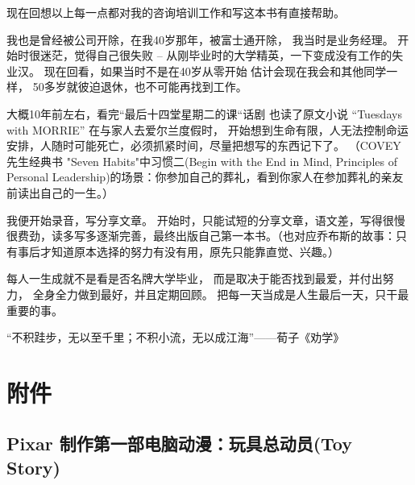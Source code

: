 {\begin{minipage}[t]{0.97\columnwidth}
现在回想以上每一点都对我的咨询培训工作和写这本书有直接帮助。

\begin{description}
\item[]
\begin{description}
\tightlist
\item[]
= = =
\end{description}
\end{description}

我也是曾经被公司开除，在我40岁那年，被富士通开除， 我当时是业务经理。
开始时很迷茫，觉得自己很失败 --
从刚毕业时的大学精英，一下变成没有工作的失业汉。
现在回看，如果当时不是在40岁从零开始 估计会现在我会和其他同学一样，
50多岁就彼迫退休，也不可能再找到工作。

\begin{description}
\item[]
\begin{description}
\tightlist
\item[]
= = =
\end{description}
\end{description}

大概10年前左右，看完``最后十四堂星期二的课``话剧 也读了原文小说
``Tuesdays with MORRIE'' 在与家人去爱尔兰度假时，
开始想到生命有限，人无法控制命运安排，人随时可能死亡，必须抓紧时间，尽量把想写的东西记下了。
（COVEY 先生经典书 "Seven Habits"中习惯二(Begin with the End in Mind,
Principles of Personal
Leadership)的场景：你参加自己的葬礼，看到你家人在参加葬礼的亲友前读出自己的一生。）

我便开始录音，写分享文章。 开始时，只能试短的分享文章，语文差，写得很慢很费劲，读多写多逐渐完善，最终出版自己第一本书。（也对应乔布斯的故事：只有事后才知道原本选择的努力有没有用，原先只能靠直觉、兴趣。）

每人一生成就不是看是否名牌大学毕业，
而是取决于能否找到最爱，并付出努力， 全身全力做到最好，并且定期回顾。
把每一天当成是人生最后一天，只干最重要的事。

“不积跬步，无以至千里；不积小流，无以成江海”——荀子《劝学》
\strut
\end{minipage}}

\hypertarget{ux9644ux4ef6}{%
\section{附件}\label{ux9644ux4ef6}}

\hypertarget{pixar-ux5236ux4f5cux7b2cux4e00ux90e8ux7535ux8111ux52a8ux6f2bux73a9ux5177ux603bux52a8ux5458toy-story}{%
\subsection{Pixar 制作第一部电脑动漫：玩具总动员(Toy
Story)}\label{pixar-ux5236ux4f5cux7b2cux4e00ux90e8ux7535ux8111ux52a8ux6f2bux73a9ux5177ux603bux52a8ux5458toy-story}}

